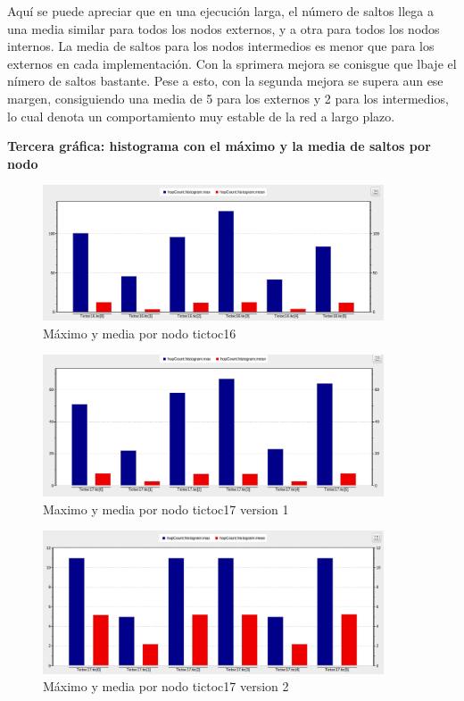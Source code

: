 \documentclass{article}
\begin{document}
		Aquí se puede apreciar que en una ejecución larga, el número de saltos llega a una media similar para todos los nodos externos, y a otra para todos los nodos internos. La media de saltos para los nodos intermedios es menor que para los externos en cada implementación. Con la sprimera mejora se conisgue que lbaje el nímero de saltos bastante. Pese a esto, con la segunda mejora se supera aun ese margen, consiguiendo una media de 5 para los externos y 2 para los intermedios, lo cual denota un comportamiento muy estable de la red a largo plazo.\\
	
		\newpage
		
		\textbf{Tercera gráfica: histograma con el máximo y la media de saltos por nodo}\\
	
		\begin{figure}[htb]
			\centering
			\includegraphics[width=0.9\textwidth]{tictoc16/figura3.png}
			\caption{Máximo y media por nodo tictoc16}
			\end {figure}
		
		\begin{figure}[htb]
			\centering
			\includegraphics[width=0.9\textwidth]{tictoc17v1/figura3.png}
			\caption{Maximo y media por nodo tictoc17 version 1}
			\end {figure}

		\newpage
		\begin{figure}[htb]
			\centering
			\includegraphics[width=0.9\textwidth]{tictoc17v2/figura3.png}
			\caption{Máximo y media por nodo tictoc17 version 2}
			\end {figure}
			
\end{document}
